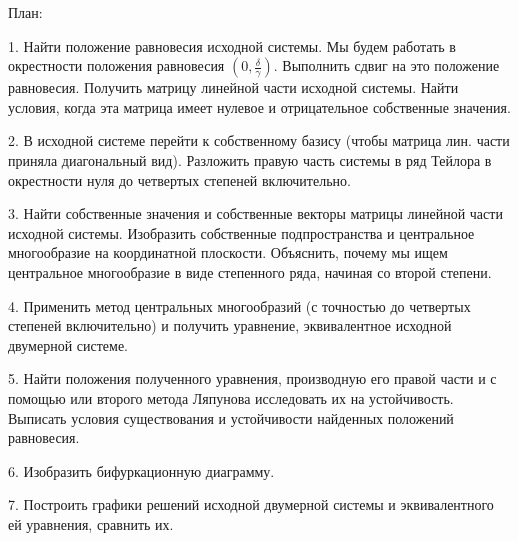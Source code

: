 
План: 

1. Найти положение равновесия исходной системы. Мы будем работать в окрестности положения равновесия $\left ( 0, \frac{\delta }{\gamma} \right )$. Выполнить сдвиг на это положение равновесия. Получить матрицу линейной части исходной системы. Найти условия, когда эта матрица имеет нулевое и отрицательное собственные значения.

2. В исходной системе перейти к собственному базису (чтобы матрица лин. части приняла диагональный вид). Разложить правую часть системы в ряд Тейлора в окрестности нуля до четвертых степеней включительно.

3. Найти собственные значения и собственные векторы матрицы линейной части исходной системы. Изобразить собственные подпространства и центральное многообразие на координатной плоскости. Объяснить, почему мы ищем центральное многообразие в виде степенного ряда, начиная со второй степени.

4. Применить метод центральных многообразий (с точностью до четвертых степеней включительно) и получить уравнение, эквивалентное исходной двумерной системе.

5. Найти положения полученного уравнения, производную его правой части и с помощью или второго метода Ляпунова исследовать их на устойчивость. Выписать условия существования и устойчивости найденных положений равновесия.

6. Изобразить бифуркационную диаграмму.

7. Построить графики решений исходной двумерной системы и эквивалентного ей уравнения, сравнить их.

